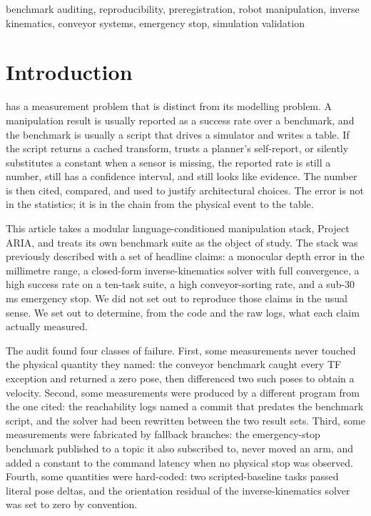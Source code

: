 \documentclass[journal]{IEEEtran}
\begin{document}
\begin{IEEEkeywords}
benchmark auditing, reproducibility, preregistration, robot manipulation, inverse kinematics, conveyor systems, emergency stop, simulation validation
\end{IEEEkeywords}

\IEEEpeerreviewmaketitle

\section{Introduction}
 has a measurement problem that is distinct from its modelling problem. A manipulation result is usually reported as a success rate over a benchmark, and the benchmark is usually a script that drives a simulator and writes a table. If the script returns a cached transform, trusts a planner's self-report, or silently substitutes a constant when a sensor is missing, the reported rate is still a number, still has a confidence interval, and still looks like evidence. The number is then cited, compared, and used to justify architectural choices. The error is not in the statistics; it is in the chain from the physical event to the table.

This article takes a modular language-conditioned manipulation stack, Project ARIA, and treats its own benchmark suite as the object of study. The stack was previously described with a set of headline claims: a monocular depth error in the millimetre range, a closed-form inverse-kinematics solver with full convergence, a high success rate on a ten-task suite, a high conveyor-sorting rate, and a sub-30\,ms emergency stop. We did not set out to reproduce those claims in the usual sense. We set out to determine, from the code and the raw logs, what each claim actually measured.

The audit found four classes of failure. First, some measurements never touched the physical quantity they named: the conveyor benchmark caught every TF exception and returned a zero pose, then differenced two such poses to obtain a velocity. Second, some measurements were produced by a different program from the one cited: the reachability logs named a commit that predates the benchmark script, and the solver had been rewritten between the two result sets. Third, some measurements were fabricated by fallback branches: the emergency-stop benchmark published to a topic it also subscribed to, never moved an arm, and added a constant to the command latency when no physical stop was observed. Fourth, some quantities were hard-coded: two scripted-baseline tasks passed literal pose deltas, and the orientation residual of the inverse-kinematics solver was set to zero by convention.
\end{document}

